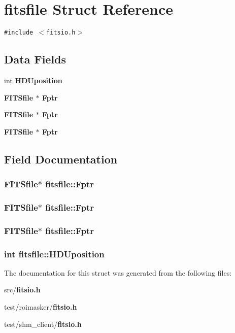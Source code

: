 \section{fitsfile Struct Reference}
\label{structfitsfile}
{\tt \#include $<$fitsio.h$>$}

\subsection*{Data Fields}
\begin{CompactItemize}
\item 
int \bf{HDUposition}
\item 
\bf{FITSfile} $\ast$ \bf{Fptr}
\item 
\bf{FITSfile} $\ast$ \bf{Fptr}
\item 
\bf{FITSfile} $\ast$ \bf{Fptr}
\end{CompactItemize}


\subsection{Field Documentation}
\subsubsection{\setlength{\rightskip}{0pt plus 5cm}\bf{FITSfile}$\ast$ \bf{fitsfile::Fptr}}\label{structfitsfile_4ce1e99e95954c8c42ccd93401c9f477}


\subsubsection{\setlength{\rightskip}{0pt plus 5cm}\bf{FITSfile}$\ast$ \bf{fitsfile::Fptr}}\label{structfitsfile_4ce1e99e95954c8c42ccd93401c9f477}


\subsubsection{\setlength{\rightskip}{0pt plus 5cm}\bf{FITSfile}$\ast$ \bf{fitsfile::Fptr}}\label{structfitsfile_4ce1e99e95954c8c42ccd93401c9f477}


\subsubsection{\setlength{\rightskip}{0pt plus 5cm}int \bf{fitsfile::HDUposition}}\label{structfitsfile_0b1d48e862cf8fb644e293e5899a7b68}




The documentation for this struct was generated from the following files:\begin{CompactItemize}
\item 
src/\bf{fitsio.h}\item 
test/roimasker/\bf{fitsio.h}\item 
test/shm\_\-client/\bf{fitsio.h}\end{CompactItemize}
